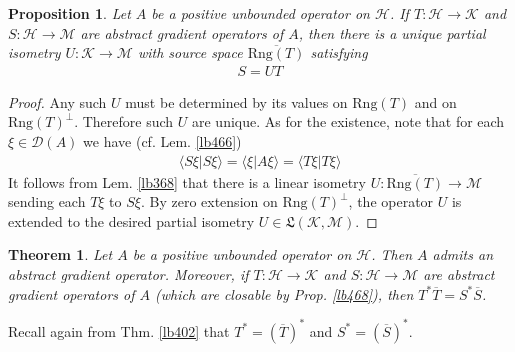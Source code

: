\documentclass[12pt,b5paper,notitlepage]{article}
\theoremstyle{definition}
\theoremstyle{plain}
\newtheorem{thm}[df]{Theorem}
\newtheorem{pp}[df]{Proposition}
\newcommand{\fk}{\mathfrak}
\newcommand{\ovl}{\overline}
\newcommand{\Dom}{\mathscr{D}}
\newcommand{\bk}[1]{\langle {#1}\rangle}
\newcommand{\Rng}{\mathrm{Rng}}
\newcommand{\MH}{\mathcal H}
\newcommand{\MK}{\mathcal K}
\newcommand{\MM}{\mathcal M}
\numberwithin{equation}{section}
\begin{document}
\begin{pp}\label{lb469}
Let $A$ be a positive unbounded operator on $\MH$. If $T:\MH\rightarrow\MK$ and $S:\MH\rightarrow\MM$ are abstract gradient operators of $A$, then there is a unique partial isometry $U:\MK\rightarrow\MM$ with source space $\ovl{\Rng(T)}$ satisfying
\begin{align*}
S=UT
\end{align*}
\end{pp}

\begin{proof}
Any such $U$ must be determined by its values on $\Rng(T)$ and on $\Rng(T)^\perp$. Therefore such $U$ are unique. As for the existence, note that for each $\xi\in\Dom(A)$ we have (cf. Lem. \ref{lb466})
\begin{align*}
\bk{S\xi|S\xi}=\bk{\xi|A\xi}=\bk{T\xi|T\xi}
\end{align*}
It follows from Lem. \ref{lb368} that there is a linear isometry $U:\ovl{\Rng(T)}\rightarrow\MM$ sending each $T\xi$ to $S\xi$. By zero extension on $\Rng(T)^\perp$, the operator $U$ is extended to the desired partial isometry $U\in\fk L(\MK,\MM)$.
\end{proof}


\begin{thm}\label{lb470}
Let $A$ be a positive unbounded operator on $\MH$. Then $A$ admits an abstract gradient operator. Moreover, if $T:\MH\rightarrow\MK$ and $S:\MH\rightarrow\MM$ are abstract gradient operators of $A$ (which are closable by Prop. \ref{lb468}), then $T^*\ovl T=S^*\ovl S$.
\end{thm}


Recall again from Thm. \ref{lb402} that $T^*=(\ovl T)^*$ and $S^*=(\ovl S)^*$.
\end{document}
